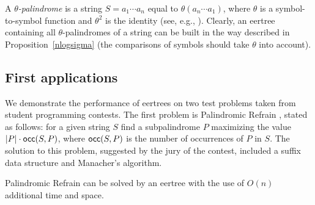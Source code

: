 \documentclass{llncs}
\def\occ{{\sf occ}}
\begin{document}
\begin{remark}
A \emph{$\theta$-palindrome} is a string $S=a_1\cdots a_n$ equal to $\theta(a_n\cdots a_1)$, where $\theta$ is a symbol-to-symbol function and $\theta^2$ is the identity (see, e.g., \cite{KaMa10}). Clearly, an eertree containing all $\theta$-palindromes of a string can be built in the way described in Proposition~\ref{nlogsigma} (the comparisons of symbols should take $\theta$ into account).
\end{remark}


\subsection{First applications}\label{palrefrain}

We demonstrate the performance of eertrees on two test problems taken from student programming contests. The first problem is {\sf Palindromic Refrain} \cite[Problem A]{Apio}, stated as follows: for a given string $S$ find a subpalindrome $P$ maximizing the value $|P|\cdot \occ(S,P)$, where $\occ(S,P)$ is the number of occurrences of $P$ in $S$. The solution to this problem, suggested by the jury of the contest, included a suffix data structure and Manacher's algorithm.

\begin{proposition}
{\sf Palindromic Refrain} can be solved by an eertree with the use of $O(n)$ additional time and space.
\end{proposition}
\end{document}
